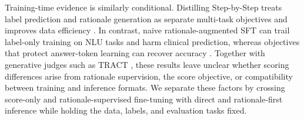 Training-time evidence is similarly conditional. Distilling Step-by-Step
treats label prediction and rationale generation as separate multi-task
objectives and improves data efficiency
\citep{hsieh-etal-2023-distilling}. In contrast, naive rationale-augmented SFT
can trail label-only training on NLU tasks and harm clinical prediction,
whereas objectives that protect answer-token learning can recover accuracy
\citep{shi-etal-2025-rationales-nlu,su-etal-2026-rationale-disease,
shi-etal-2025-sftkey}. Together with generative judges such as TRACT
\citep{chiang-etal-2025-tract}, these results leave unclear whether scoring
differences arise from rationale supervision, the score objective, or
compatibility between training and inference formats. We separate these
factors by crossing score-only and rationale-supervised fine-tuning with
direct and rationale-first inference while holding the data, labels, and
evaluation tasks fixed.
